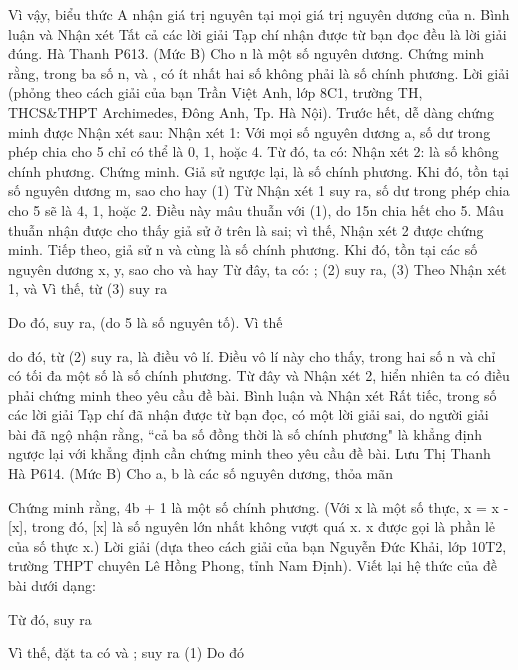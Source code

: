 \begin{multicols}{2}
	Vì vậy, biểu thức A nhận giá trị nguyên tại mọi giá trị nguyên dương của n.
	Bình luận và Nhận xét
	Tất cả các lời giải Tạp chí nhận được từ bạn đọc đều là lời giải đúng.
	Hà Thanh
	P613. (Mức B) Cho n là một số nguyên dương. Chứng minh rằng, trong ba số n,   và  , có ít nhất hai số không phải là số chính phương.
	Lời giải (phỏng theo cách giải của bạn Trần Việt Anh, lớp 8C1, trường TH, THCS&THPT Archimedes, Đông Anh, Tp. Hà Nội).
	Trước hết, dễ dàng chứng minh được Nhận xét sau:
	Nhận xét 1: Với mọi số nguyên dương a, số dư trong phép chia   cho 5 chỉ có thể là 0, 1, hoặc 4.
	Từ đó, ta có:
	Nhận xét 2:   là số không chính phương.
	Chứng minh. Giả sử ngược lại,   là số chính phương.
	Khi đó, tồn tại số nguyên dương m, sao cho
	hay                                                  (1)
	Từ Nhận xét 1 suy ra, số dư trong phép chia   cho 5 sẽ là 4, 1, hoặc 2. Điều này mâu thuẫn với (1), do 15n chia hết cho 5. Mâu thuẫn nhận được cho thấy giả sử ở trên là sai; vì thế, Nhận xét 2 được chứng minh.
	Tiếp theo, giả sử n và   cùng là số chính phương. Khi đó, tồn tại các số nguyên dương x, y, sao cho   và   hay   Từ đây, ta có:
	;                                                                 (2)
	suy ra,                                                                                                                         (3)
	Theo Nhận xét 1,   và  
	Vì thế, từ (3) suy ra
	
	Do đó,   suy ra,   (do 5 là số nguyên tố). Vì thế
	
	do đó, từ (2) suy ra,   là điều vô lí. Điều vô lí này cho thấy, trong hai số n và   chỉ có tối đa một số là số chính phương. Từ đây và Nhận xét 2, hiển nhiên ta có điều phải chứng minh theo yêu cầu đề bài.
	Bình luận và Nhận xét
	Rất tiếc, trong số các lời giải Tạp chí đã nhận được từ bạn đọc, có một lời giải sai, do người giải bài đã ngộ nhận rằng, ``cả ba số đồng thời là số chính phương" là khẳng định ngược lại với khẳng định cần chứng minh theo yêu cầu đề bài.
	Lưu Thị Thanh Hà
	P614. (Mức B) Cho a, b là các số nguyên dương, thỏa mãn
	
	Chứng minh rằng, 4b + 1 là một số chính phương.
	(Với x là một số thực, {x} = x - [x], trong đó, [x] là số nguyên lớn nhất không vượt quá x. {x} được gọi là phần lẻ của số thực x.)
	Lời giải (dựa theo cách giải của bạn Nguyễn Đức Khải, lớp 10T2, trường THPT chuyên Lê Hồng Phong, tỉnh Nam Định).
	Viết lại hệ thức của đề bài dưới dạng:
	
	Từ đó, suy ra
	
	Vì thế, đặt   ta có   và
	;
	suy ra
	(1)
	Do đó
	

\end{multicols}
